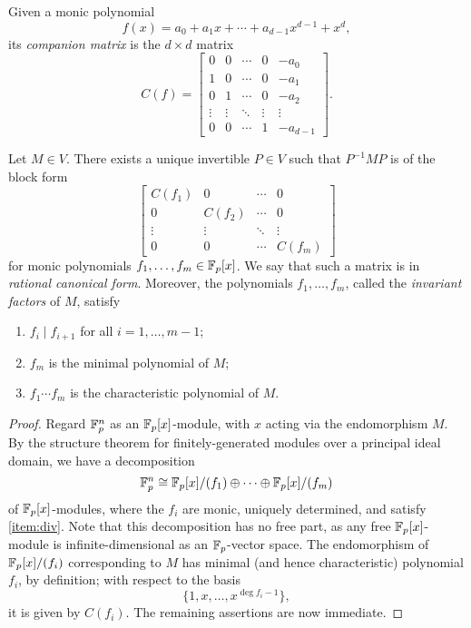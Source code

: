 \begin{notation}
Given a monic polynomial
\begin{equation*}
f(x)=a_0+a_1x+\cdots+a_{d-1}x^{d-1}+x^d,
\end{equation*}
its \emph{companion matrix} is the $d\times d$ matrix
\begin{equation*}
C(f)=\begin{bmatrix}
0&0&\cdots&0&-a_0\\
1&0&\cdots&0&-a_1\\
0&1&\cdots&0&-a_2\\
\vdots&\vdots&\ddots&\vdots&\vdots\\
0&0&\cdots&1&-a_{d-1}
\end{bmatrix}.
\end{equation*}
\end{notation}
\begin{thm}
\label{thm:rcf}
Let $M\in V$. There exists a unique invertible $P\in V$ such that $P^{-1}MP$ is of the block form
\begin{equation}
\label{eqn:rcf}
\begin{bmatrix}
C(f_1)&0&\cdots&0\\
0&C(f_2)&\cdots&0\\
\vdots&\vdots&\ddots&\vdots\\
0&0&\cdots&C(f_m)
\end{bmatrix}
\end{equation}
for monic polynomials $f_1,\ldots,f_m\in\mathbb{F}_p[x]$. We say that such a matrix is in \emph{rational canonical form}. Moreover, the polynomials $f_1,\ldots,f_m$, called the \emph{invariant factors} of $M$, satisfy
\begin{enumerate}
\item $f_i\mid f_{i+1}$ for all $i=1,\ldots,m-1$;\label{item:div}
\item $f_m$ is the minimal polynomial of $M$;\label{item:min}
\item $f_1\cdots f_m$ is the characteristic polynomial of $M$.\label{item:char}
\end{enumerate}
\end{thm}
\begin{proof}
Regard $\mathbb{F}_p^n$ as an $\mathbb{F}_p[x]$-module, with $x$ acting via the endomorphism $M$. By the structure theorem for finitely-generated modules over a principal ideal domain, we have a decomposition
\begin{equation*}
\mathbb{F}_p^n\cong\mathbb{F}_p[x]/(f_1)\oplus\cdots\oplus\mathbb{F}_p[x]/(f_m)
\end{equation*}
of $\mathbb{F}_p[x]$-modules, where the $f_i$ are monic, uniquely determined, and satisfy \eqref{item:div}. Note that this decomposition has no free part, as any free $\mathbb{F}_p[x]$-module is infinite-dimensional as an $\mathbb{F}_p$-vector space. The endomorphism of $\mathbb{F}_p[x]/(f_i)$ corresponding to $M$ has minimal (and hence characteristic) polynomial $f_i$, by definition; with respect to the basis
\begin{equation*}
\{1,x,\ldots,x^{\deg f_i-1}\},
\end{equation*}
it is given by $C(f_i)$. The remaining assertions are now immediate.
\end{proof}
